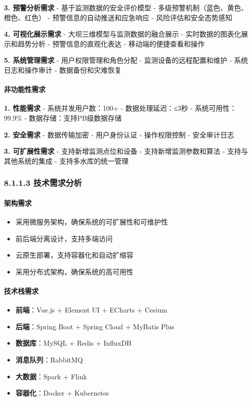 \textbf{3. 预警分析需求} - 基于监测数据的安全评价模型 -
多级预警机制（蓝色、黄色、橙色、红色） - 预警信息的自动推送和应急响应 -
风险评估和安全态势感知

\textbf{4. 可视化展示需求} - 大坝三维模型与监测数据的融合展示 -
实时数据的图表化展示和趋势分析 - 预警信息的直观化表达 -
移动端的便捷查看和操作

\textbf{5. 系统管理需求} - 用户权限管理和角色分配 -
监测设备的远程配置和维护 - 系统日志和操作审计 - 数据备份和灾难恢复

\paragraph{非功能性需求}\label{ux975eux529fux80fdux6027ux9700ux6c42}

\textbf{1. 性能需求} - 系统并发用户数：100+ - 数据处理延迟：≤3秒 -
系统可用性：99.9\% - 数据存储：支持PB级数据存储

\textbf{2. 安全需求} - 数据传输加密 - 用户身份认证 - 操作权限控制 -
安全审计日志

\textbf{3. 可扩展性需求} - 支持新增监测点位和设备 -
支持新增监测参数和算法 - 支持与其他系统的集成 - 支持多水库的统一管理

\subsubsection{8.1.1.3
技术需求分析}\label{ux6280ux672fux9700ux6c42ux5206ux6790}

\paragraph{架构需求}\label{ux67b6ux6784ux9700ux6c42}

\begin{itemize}
\tightlist
\item
  采用微服务架构，确保系统的可扩展性和可维护性
\item
  前后端分离设计，支持多端访问
\item
  云原生部署，支持容器化和自动扩缩容
\item
  采用分布式架构，确保系统的高可用性
\end{itemize}

\paragraph{技术栈需求}\label{ux6280ux672fux6808ux9700ux6c42}

\begin{itemize}
\tightlist
\item
  \textbf{前端}：Vue.js + Element UI + ECharts + Cesium
\item
  \textbf{后端}：Spring Boot + Spring Cloud + MyBatis Plus
\item
  \textbf{数据库}：MySQL + Redis + InfluxDB
\item
  \textbf{消息队列}：RabbitMQ
\item
  \textbf{大数据}：Spark + Flink
\item
  \textbf{容器化}：Docker + Kubernetes
\end{itemize}

